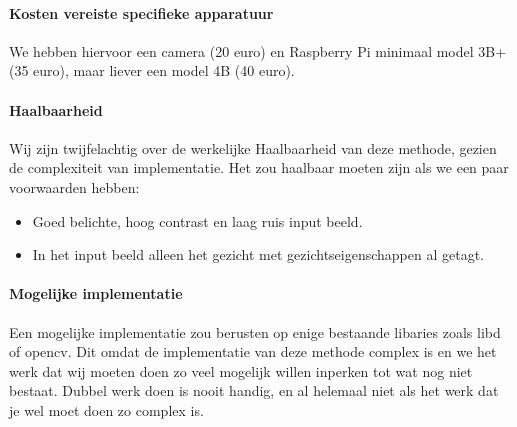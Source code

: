 \documentclass[11pt]{article}
\begin{document}
    \paragraph{Kosten vereiste specifieke apparatuur}
    We hebben hiervoor een camera (20 euro) en Raspberry Pi minimaal model 3B+ (35 euro), maar liever een model 4B (40 euro).

    \paragraph{Haalbaarheid}
    Wij zijn twijfelachtig over de werkelijke Haalbaarheid van deze methode, gezien de complexiteit van implementatie.
    Het zou haalbaar moeten zijn als we een paar voorwaarden hebben:
    \begin{itemize}
        \item Goed belichte, hoog contrast en laag ruis input beeld.
        \item In het input beeld alleen het gezicht met gezichtseigenschappen al getagt.
    \end{itemize}

    \paragraph{Mogelijke implementatie}
    Een mogelijke implementatie zou berusten op enige bestaande libaries zoals libd of opencv.
    Dit omdat de implementatie van deze methode complex is en we het werk dat wij moeten doen zo veel mogelijk willen inperken tot wat nog niet bestaat.
    Dubbel werk doen is nooit handig, en al helemaal niet als het werk dat je wel moet doen zo complex is.


    
\end{document}
